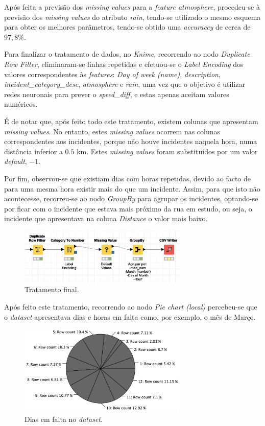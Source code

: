\documentclass[a4paper, 12pt]{article}
\begin{document}
Após feita a previsão dos \textit{missing values} para a \textit{feature atmosphere}, procedeu-se à previsão dos \textit{missing values} do atributo \textit{rain}, tendo-se utilizado o mesmo esquema para obter os melhores parâmetros, tendo-se obtido uma \textit{accuraccy} de cerca de $97,8\%$.

Para finalizar o tratamento de dados, no \textit{Knime}, recorrendo ao nodo \textit{Duplicate Row Filter}, eliminaram-se linhas repetidas e efetuou-se o \textit{Label Encoding} dos valores correspondentes às \textit{features}: \textit{Day of week (name)}, \textit{description}, \textit{incident\_category\_desc}, \textit{atmosphere} e \textit{rain}, uma vez que o objetivo é utilizar redes neuronais para prever o \textit{speed\_diff}, e estas apenas aceitam valores numéricos.

É de notar que, após feito todo este tratamento, existem colunas que apresentam \textit{missing values}. No entanto, estes \textit{missing values} ocorrem nas colunas correspondentes aos incidentes, porque não houve incidentes naquela hora, numa distância inferior a $0.5$ km. Estes \textit{missing values} foram substituídos por um valor \textit{default}, $-1$.

Por fim, observou-se que existiam dias com horas repetidas, devido ao facto de para uma mesma hora existir mais do que um incidente. Assim, para que isto não acontecesse, recorreu-se ao nodo \textit{GroupBy} para agrupar os incidentes, optando-se por ficar com o incidente que estava mais próximo da rua em estudo, ou seja, o incidente que apresentava na coluna \textit{Distance} o valor mais baixo.

\begin{figure}[H]
	\centering
	\includegraphics[width=8cm]{fim}
	\caption{Tratamento final.}
\end{figure}

Após feito este tratamento, recorrendo ao nodo \textit{Pie chart (local)} percebeu-se que o \textit{dataset} apresentava dias e horas em falta como, por exemplo, o mês de Março.

\begin{figure}[H]
	\centering
	\includegraphics[width=8cm]{mes_dias}
	\caption{Dias em falta no \textit{dataset}.}
\end{figure}
\end{document}
